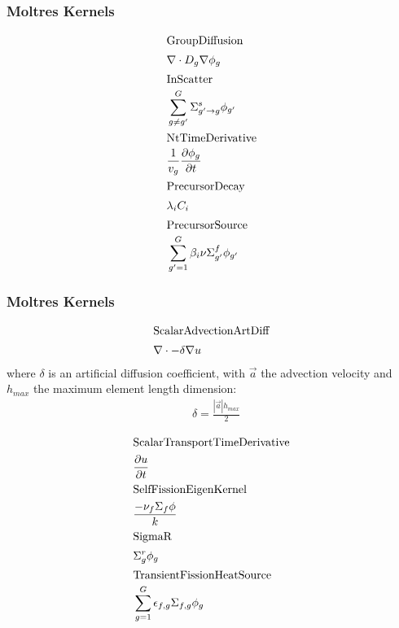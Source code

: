 \begin{frame}
        \frametitle{Moltres Kernels}
        \footnotesize{
\begin{align*}
\intertext{GroupDiffusion}
& \nabla \cdot D_g
        \nabla \phi_g\\
\intertext{InScatter}
&\sum_{g \ne g'}^G
        \Sigma_{g'\rightarrow g}^s \phi_{g'}\\
\intertext{NtTimeDerivative}
&\frac{1}{v_g}\frac{\partial \phi_g}{\partial t}\\
\intertext{PrecursorDecay}
&\lambda_i C_i\\
\intertext{PrecursorSource}
&\sum_{g'= 1}^G \beta_i \nu
        \Sigma_{g'}^f \phi_{g'}\\
\end{align*}
}
\end{frame}

\begin{frame}
        \frametitle{Moltres Kernels}
        \footnotesize{
\begin{align*}
\intertext{ScalarAdvectionArtDiff}
&\nabla \cdot -\delta \nabla u\\
\end{align*}
where $\delta$ is an artificial diffusion coefficient, with $\vec{a}$ the 
        advection velocity and $h_{max}$ the maximum element length dimension:
\begin{align*}
&\delta = \frac{|\vec{a}| h_{max}}{2}\\
\end{align*}
\begin{align*}
\intertext{ScalarTransportTimeDerivative}
&\frac{\partial u}{\partial t}\\
\intertext{SelfFissionEigenKernel}
&\frac{-\nu_f \Sigma_f \phi}{k}\\
\intertext{SigmaR}
&\Sigma_g^r \phi_g\\
\intertext{TransientFissionHeatSource}
&\sum_{g=1}^G \epsilon_{f,g}\Sigma_{f,g}\phi_g\\
\end{align*}
        }
\end{frame}



